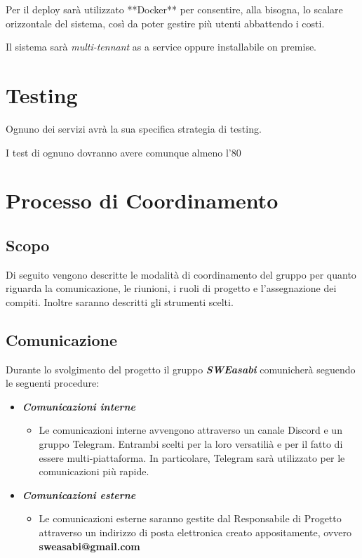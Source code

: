 Per il deploy sarà utilizzato **Docker** per consentire, alla bisogna, lo scalare orizzontale del sistema, così da poter gestire più utenti abbattendo i costi.
        
Il sistema sarà \textit{multi-tennant} as a service oppure installabile on premise.

\section{Testing}

Ognuno dei servizi avrà la sua specifica strategia di testing.

I test di ognuno dovranno avere comunque almeno l'80%

\section{Processo di Coordinamento}

\subsection{Scopo}
Di seguito vengono descritte le modalità di coordinamento del gruppo per quanto riguarda la comunicazione, le riunioni, i ruoli di progetto e l'assegnazione dei compiti. Inoltre saranno descritti gli strumenti scelti.

\subsection{Comunicazione}
Durante lo svolgimento del progetto il gruppo \textbf{\textsl{SWEasabi}} comunicherà seguendo le seguenti procedure:

\begin{itemize}
\item \textbf{\textsl{Comunicazioni interne}}
\begin{itemize} 
    \item Le comunicazioni interne avvengono attraverso un canale Discord e un gruppo Telegram. Entrambi scelti per la loro versatilià e per il fatto di essere multi-piattaforma. In particolare, Telegram sarà utilizzato per le comunicazioni più rapide.\end{itemize}

\item \textbf{\textsl{Comunicazioni esterne}}
\begin{itemize} 
    \item Le comunicazioni esterne saranno gestite dal Responsabile di Progetto attraverso un indirizzo di posta elettronica creato appositamente, ovvero \textbf{sweasabi@gmail.com}
\end{itemize}
\end{itemize}


